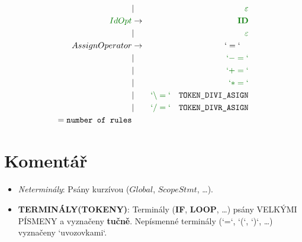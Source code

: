 \documentclass[a4paper,11pt,landscape,leqno]{article}
\begin{document}
\begin{eqnarray}
& | &   \textcolor{green1}{\varepsilon} \\
\textcolor{green1}{IdOpt}   & \rightarrow & \textcolor{green1}{\textbf{ID}} \\
        & | &  \textcolor{green1}{\varepsilon} \\
AssignOperator  &    \rightarrow    &    `=` \quad      \\
        &   |       &   \textcolor{green1}{`-=`}    \\
        &   |       &   \textcolor{green1}{`+=`}    \\
        &   |       &   \textcolor{green1}{`*=`}    \\
        &   |       &   \textcolor{green1}{`\backslash =`}\quad \textrm{\texttt{TOKEN\_DIVI\_ASIGN}}    \\
        &   |       &   \textcolor{green1}{`/=`}\quad \textrm{\texttt{TOKEN\_DIVR\_ASIGN}}\\
 = \textrm{\texttt{number of rules}} & & 
\end{eqnarray}

\section{Komentář}
\begin{itemize}
\item{\emph{Neterminály}: Psány kurzívou ($Global$, $ScopeStmt$, \dots).}
\item{\textbf{TERMINÁLY(TOKENY)}: Terminály (\textbf{IF}, \textbf{LOOP}, \dots) psány VELKÝMI PÍSMENY a vyznačeny \textbf{tučně}. Nepísmenné terminály (`=`, `(`, `)`, \dots) vyznačeny `uvozovkami`.}
\end{itemize}
\enddocument
\end{document}
